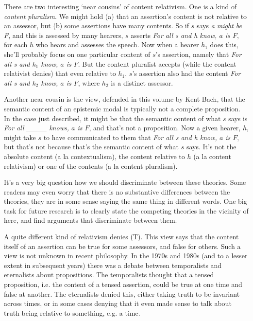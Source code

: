 There are two interesting `near cousins' of content relativism. One is a kind of \textit{content pluralism}. We might hold (a) that an assertion's content is not relative to an assessor, but (b) some assertions have many contents. So if $s$ says \textit{a might be F}, and this is assessed by many hearers, $s$ asserts \textit{For all s and h know, $a$ is $F$}, for each $h$ who hears and assesses the speech. Now when a hearer $h_1$ does this, she'll probably focus on one particular content of $s$'s assertion, namely that \textit{For all s and h$_1$ know, $a$ is $F$}. But the content pluralist accepts (while the content relativist denies) that even relative to $h_1$, $s$'s assertion also had the content \textit{For all s and h$_2$ know, $a$ is $F$}, where $h_2$ is a distinct assessor.

Another near cousin is the view, defended in this volume by Kent Bach, that the semantic content of an epistemic modal is typically not a complete proposition. In the case just described, it might be that the semantic content of what $s$ says is \textit{For all \_\_\_\_  knows, $a$ is $F$}, and that's not a proposition. Now a given hearer, $h$, might take $s$ to have communicated to them that \textit{For all s and h know, $a$ is $F$}, but that's not because that's the semantic content of what $s$ says. It's not the absolute content (a la contextualism), the content relative to $h$ (a la content relativism) or one of the contents (a la content pluralism).

It's a very big question how we should discriminate between these theories. Some readers may even worry that there is no substantive differences between the theories, they are in some sense saying the same thing in different words. One big task for future research is to clearly state the competing theories in the vicinity of here, and find arguments that discriminate between them.

A quite different kind of relativism denies (T). This view says that the content itself of an assertion can be true for some assessors, and false for others. Such a view is not unknown in recent philosophy. In the 1970s and 1980s (and to a lesser extent in subsequent years) there was a debate between temporalists and eternalists about propositions. The temporalists thought that a tensed proposition, i.e. the content of a tensed assertion, could be true at one time and false at another. The eternalists denied this, either taking truth to be invariant across times, or in some cases denying that it even made sense to talk about truth being relative to something, e.g. a time.

